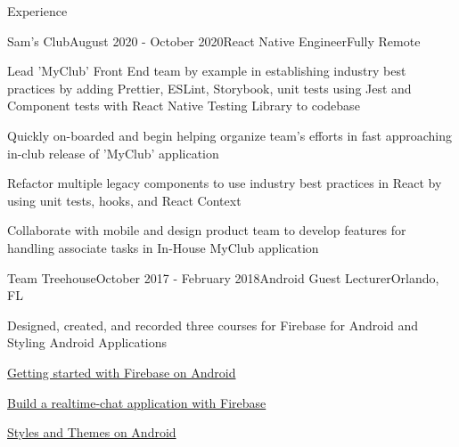 \documentclass{resume} %
\begin{document}
\begin{rSection}{Experience}


\begin{rSubsection}{Sam's Club}{August 2020 - October 2020}{React Native Engineer}{Fully Remote}
\item Lead 'MyClub' Front End team by example in establishing industry best practices by adding Prettier, ESLint, Storybook, unit tests using Jest and Component tests with React Native Testing Library to codebase
\item Quickly on-boarded and begin helping organize team's efforts in fast approaching in-club release of 'MyClub' application
\item Refactor multiple legacy components to use industry best practices in React by using unit tests, hooks, and React Context
\item Collaborate with mobile and design product team to develop features for handling associate tasks in In-House MyClub application
\end{rSubsection}


\begin{rSubsection}{Team Treehouse}{October 2017 - February 2018}{Android Guest Lecturer}{Orlando, FL}
\item Designed, created, and recorded three courses for Firebase for Android and Styling Android Applications
\item \href{https://teamtreehouse.com/library/getting-started-with-firebase}{Getting started with Firebase on Android}
\item \href{https://teamtreehouse.com/library/build-a-realtime-database-app-with-firebase}{Build a realtime-chat application with Firebase}
\item \href{https://teamtreehouse.com/library/styles-and-themes-in-android}{Styles and Themes on Android}
\end{rSubsection}



\end{rSection}
\end{document}
